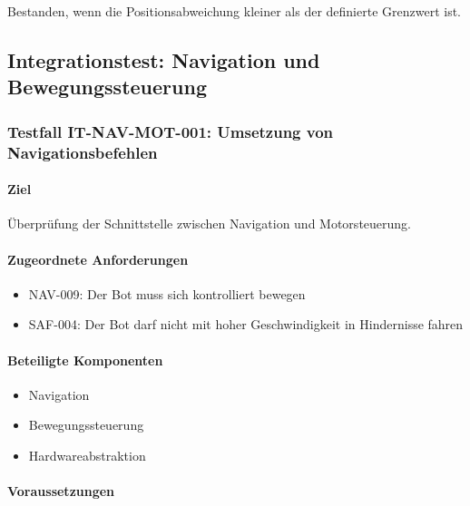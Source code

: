Bestanden, wenn die Positionsabweichung kleiner als der definierte
Grenzwert ist.

\subsection{Integrationstest: Navigation und
Bewegungssteuerung}\label{integrationstest-navigation-und-bewegungssteuerung}

\subsubsection{Testfall IT-NAV-MOT-001: Umsetzung von
Navigationsbefehlen}\label{testfall-it-nav-mot-001-umsetzung-von-navigationsbefehlen}

\paragraph{Ziel}\label{ziel-11}

Überprüfung der Schnittstelle zwischen Navigation und Motorsteuerung.

\paragraph{Zugeordnete
Anforderungen}\label{zugeordnete-anforderungen-11}

\begin{itemize}
\tightlist
\item
  NAV-009: Der Bot muss sich kontrolliert bewegen
\item
  SAF-004: Der Bot darf nicht mit hoher Geschwindigkeit in Hindernisse
  fahren
\end{itemize}

\paragraph{Beteiligte Komponenten}\label{beteiligte-komponenten-2}

\begin{itemize}
\tightlist
\item
  Navigation
\item
  Bewegungssteuerung
\item
  Hardwareabstraktion
\end{itemize}

\paragraph{Voraussetzungen}\label{voraussetzungen-11}

